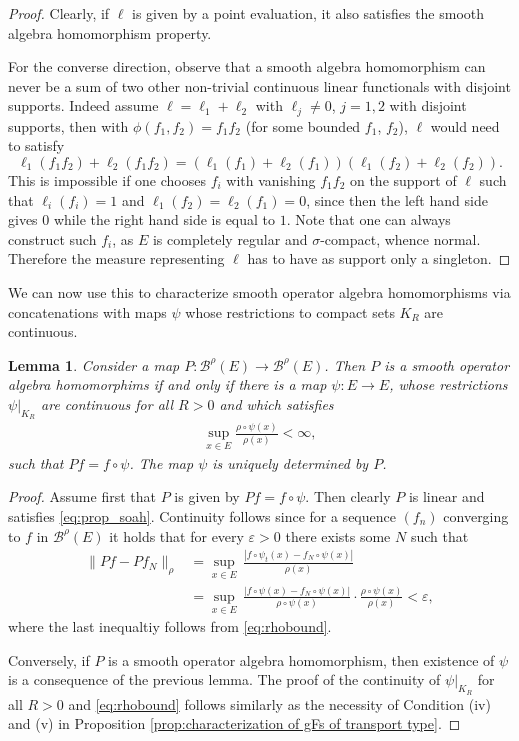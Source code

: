 \documentclass[a4paper,12pt]{article}
\newtheorem{lemma}[theorem]{Lemma}
\theoremstyle{definition}
\theoremstyle{remark}
\numberwithin{equation}{section}
\numberwithin{theorem}{section}
\begin{document}
\begin{proof}
Clearly, if $\ell$ is given by a point evaluation, it also satisfies the smooth algebra homomorphism property. 

For the converse direction, observe that
a smooth algebra homomorphism can never be a sum of two other non-trivial continuous linear functionals with disjoint supports. Indeed assume $ \ell = \ell_1 +  \ell_2 $ with $\ell_j \neq 0$, $j=1,2$ with disjoint supports, then with $\phi(f_1,f_2)=f_1f_2$ (for some bounded $f_1$, $f_2$), $\ell$ would need to satisfy
$$
\ell_1(f_1f_2) + \ell_2(f_1f_2) = (\ell_1(f_1)+\ell_2(f_1))(\ell_1(f_2)+\ell_2(f_2)).
$$
This is impossible if one chooses $f_i$ with vanishing $f_1f_2$ on the support of $\ell$ such that $\ell_i(f_i)=1$ and $\ell_1(f_2)=\ell_2(f_1)=0$, since then the left hand side gives $0$ while the right hand side is equal to $1$.
Note that  one can always construct such $f_i$, as
$E$ is completely regular and $\sigma$-compact, whence normal. Therefore the measure representing $\ell$ has to have as support only a singleton.
\end{proof}

We can now use this to characterize smooth operator algebra homomorphisms via concatenations with maps $\psi$ whose restrictions to compact sets $K_R$ are continuous.

\begin{lemma}\label{lem:soah}
Consider a map $P:\mathcal{\mathscr{B}}^{\rho}(E) \to \mathcal{\mathscr{B}}^{\rho}(E)$. Then $P$ is a smooth operator algebra homomorphims if and only if there is a map $\psi: E \to E$, 
whose restrictions $\psi|_{K_R}$ are continuous for all $R >0$ and which satisfies 
\begin{align}\label{eq:rhobound}
\sup_{x \in E} \frac{\rho \circ \psi(x)} {\rho(x)} < \infty,
\end{align}
such that $Pf=f \circ \psi$. The map $\psi$ is uniquely determined by $P$.
\end{lemma}

\begin{proof}
Assume first that $P$ is given by $Pf=f \circ \psi$. Then clearly $P$ is linear and  satisfies \eqref{eq:prop_soah}.  Continuity follows since
for a sequence $(f_n)$ converging to $f$ in $\mathcal{\mathscr{B}}^{\rho}(E) $ it holds that for every $\varepsilon >0$ there exists some $N$ such that
\begin{align*}
\| Pf-Pf_N\|_{\rho} &=\underset{x\in E}{\sup}\,\frac{\left|f\circ\psi_{t}(x)-f_{N}\circ\psi(x)\right|}{\rho(x)} \\& =\underset{x\in E}{\sup}\,\frac{\left|f\circ\psi(x)-f_{N}\circ\psi(x)\right|}{\rho\circ\psi(x)}\cdot\frac{\rho\circ\psi(x)}{\rho(x)} < \varepsilon,
\end{align*}
where the last inequaltiy follows from \eqref{eq:rhobound}.


Conversely, if $P$ is a smooth operator algebra homomorphism, then existence of $\psi$ is a consequence of the previous lemma. The proof of the continuity of $\psi|_{K_R}$ for all $R >0$ and \eqref{eq:rhobound} follows similarly as the necessity of Condition (iv)  and (v) in 
Proposition \ref{prop:characterization of gFs of transport type}.   
\end{proof}
\end{document}
